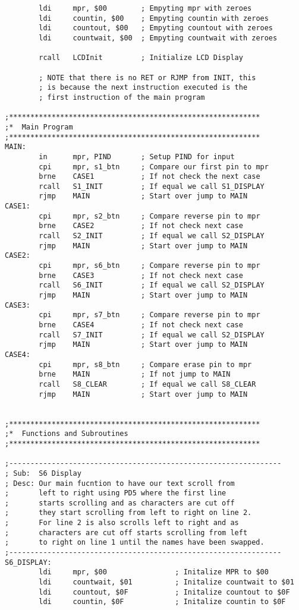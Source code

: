 \documentclass[12pt, letterpaper]{article}
\begin{document}
\begin{verbatim}
		ldi		mpr, $00		; Empyting mpr with zeroes
		ldi		countin, $00	; Empyting countin with zeroes
		ldi		countout, $00	; Empyting countout with zeroes
		ldi		countwait, $00	; Empyting countwait with zeroes

		rcall	LCDInit			; Initialize LCD Display

		; NOTE that there is no RET or RJMP from INIT, this
		; is because the next instruction executed is the
		; first instruction of the main program

;***********************************************************
;*	Main Program
;***********************************************************
MAIN:
		in		mpr, PIND		; Setup PIND for input
		cpi		mpr, s1_btn		; Compare our first pin to mpr
		brne	CASE1			; If not check the next case
		rcall	S1_INIT			; If equal we call S1_DISPLAY
		rjmp	MAIN			; Start over jump to MAIN
CASE1:	
		cpi		mpr, s2_btn		; Compare reverse pin to mpr
		brne	CASE2			; If not check next case
		rcall	S2_INIT			; If equal we call S2_DISPLAY
		rjmp	MAIN			; Start over jump to MAIN
CASE2:  
		cpi		mpr, s6_btn		; Compare reverse pin to mpr
		brne	CASE3			; If not check next case
		rcall	S6_INIT			; If equal we call S2_DISPLAY
		rjmp	MAIN			; Start over jump to MAIN
CASE3:
		cpi		mpr, s7_btn		; Compare reverse pin to mpr
		brne	CASE4			; If not check next case
		rcall	S7_INIT			; If equal we call S2_DISPLAY
		rjmp	MAIN			; Start over jump to MAIN
CASE4:
		cpi		mpr, s8_btn		; Compare erase pin to mpr
		brne	MAIN			; If not jump to MAIN
		rcall	S8_CLEAR		; If equal we call S8_CLEAR
		rjmp	MAIN			; Start over jump to MAIN


;***********************************************************
;*	Functions and Subroutines
;***********************************************************

;----------------------------------------------------------------
; Sub:	S6 Display
; Desc:	Our main fucntion to have our text scroll from
;		left to right using PD5 where the first line
;		starts scrolling and as characters are cut off
;		they start scrolling from left to right on line 2.
;       For line 2 is also scrolls left to right and as
;		characters are cut off starts scrolling from left
;		to right on line 1 until the names have been swapped.
;----------------------------------------------------------------
S6_DISPLAY:
		ldi		mpr, $00				; Initalize MPR to $00
		ldi		countwait, $01			; Initalize countwait to $01
		ldi		countout, $0F			; Initalize countout to $0F
		ldi		countin, $0F			; Initalize countin to $0F
		

\end{verbatim}
\end{document}
